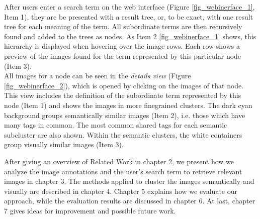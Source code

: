 After users enter a search term on the web interface (Figure \ref{fig_webinerface_1}, Item 1), they are be presented with a result tree, or, to be exact, with one result tree for each meaning of the term.
All subordinate terms are then recursively found and added to the trees as nodes.
As Item 2 \ref{fig_webinerface_1} shows, this hierarchy is displayed when hovering over the image rows.
Each row shows a preview of the images found for the term represented by this particular node (Item 3). \\
All images for a node can be seen in the \emph{details view} (Figure \ref{fig_webinerface_2}), which is opened by clicking on the images of that node.
This view includes the definition of the subordinate term represented by this node (Item 1)
and shows the images in more finegrained clusters.
The dark cyan background groups semantically similar images (Item 2), i.e. those which have many tags in common. The most common shared tags for each semantic subcluster are also shown.
Within the semantic clusters, the white containers group visually similar images (Item 3). 

\bigskip

After giving an overview of Related Work in chapter 2, we present how we analyze the image annotations and the user's search term to retrieve relevant images in chapter 3. The methods applied to cluster the images semantically and visually are described in chapter 4. Chapter 5 explains how we evaluate our approach, while the evaluation results are discussed in chapter 6. At last, chapter 7 gives ideas for improvement and possible future work.
